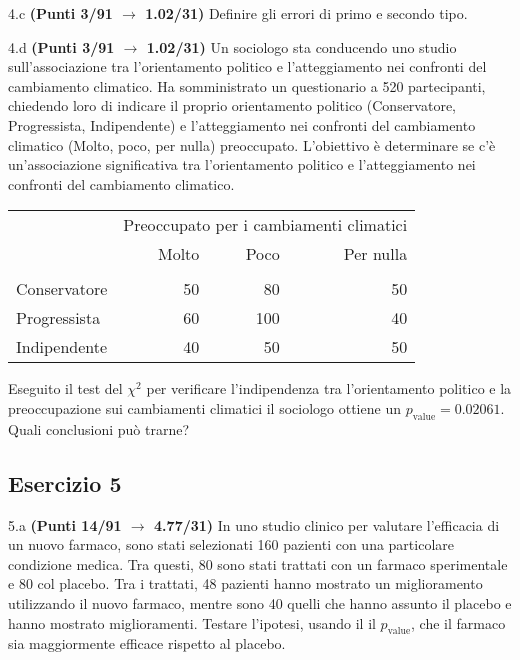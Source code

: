 \documentclass[
  11pt,
]{book}
\theoremstyle{mytheoremstyle}
\theoremstyle{mydefstyle}
\begin{document}
4.c \textbf{(Punti 3/91 \(\rightarrow\) 1.02/31)} Definire gli errori di primo e secondo tipo.

4.d \textbf{(Punti 3/91 \(\rightarrow\) 1.02/31)} Un sociologo sta conducendo uno studio sull'associazione tra l'orientamento politico e l'atteggiamento nei confronti del cambiamento climatico. Ha somministrato un questionario a 520 partecipanti, chiedendo loro di indicare il proprio orientamento politico (Conservatore, Progressista, Indipendente) e l'atteggiamento nei confronti del cambiamento climatico (Molto, poco, per nulla) preoccupato. L'obiettivo è determinare se c'è un'associazione significativa tra l'orientamento politico e l'atteggiamento nei confronti del cambiamento climatico.

\begin{table}[H]
\centering\centering\centering
\begin{tabular}{lrrr}
\toprule
\multicolumn{1}{c}{ } & \multicolumn{3}{c}{Preoccupato per i cambiamenti climatici} \\
\cmidrule(l{3pt}r{3pt}){2-4}
  & Molto & Poco & Per nulla\\
\midrule
\addlinespace[0.3em]
\multicolumn{4}{l}{\textbf{Orientamento politico}}\\
\hspace{1em}Conservatore & 50 & 80 & 50\\
\hspace{1em}Progressista & 60 & 100 & 40\\
\hspace{1em}Indipendente & 40 & 50 & 50\\
\bottomrule
\end{tabular}
\end{table}

Eseguito il test del \(\chi^2\) per verificare l'indipendenza tra l'orientamento politico e la preoccupazione
sui cambiamenti climatici il sociologo ottiene un \(p_\text{value}=0.02061\). Quali conclusioni può trarne?

\subsection{Esercizio 5}\label{esercizio-5-31}

5.a \textbf{(Punti 14/91 \(\rightarrow\) 4.77/31)} In uno studio clinico per valutare l'efficacia di un nuovo farmaco, sono stati selezionati 160 pazienti con una particolare condizione medica. Tra questi, 80 sono stati trattati con un farmaco sperimentale e 80 col placebo. Tra i trattati, 48 pazienti hanno mostrato un miglioramento utilizzando il nuovo farmaco, mentre sono 40 quelli che hanno assunto il placebo e hanno mostrato miglioramenti. Testare l'ipotesi, usando il il \(p_\text{value}\), che il farmaco sia maggiormente efficace rispetto al placebo.
\end{document}

